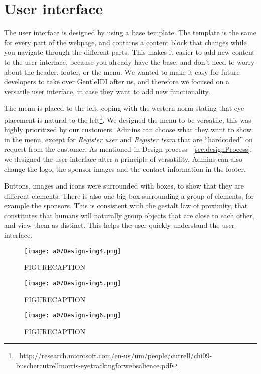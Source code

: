 \section{User interface}

The user interface is designed by using a base template. The template is
the same for every part of the webpage, and contains a content block
that changes while you navigate through the different parts. This makes
it easier to add new content to the user interface, because you already
have the base, and don't need to worry about the
header, footer, or the menu. We wanted to make it easy for future
developers to take over GentleIDI after us, and therefore we focused on
a versatile user interface, in case they want to add new functionality.

The menu is placed to the left, coping with the western norm stating
that eye placement is natural to the
left\footnote{\ http://research.microsoft.com/en-us/um/people/cutrell/chi09-buschercutrellmorris-eyetrackingforwebsalience.pdf}.
We designed the menu to be versatile, this was highly prioritized by our customers.
Admins can choose what they want to show in the menu, except for \textit{Register user} and
\textit{Register team} that are ``hardcoded'' on request from the
customer. As mentioned
in Design process ~\ref{sec:designProcess}, we designed the user interface after a principle
of versatility. Admins can also change the logo, the sponsor images and
the contact information in the footer.

Buttons, images and icons were surrounded with boxes, to show that they are different
elements. There is also one big box surrounding a group of elements,
for example the sponsors. This is consistent with the gestalt law of
proximity, that constitutes that humans will naturally group objects
that are close to each other, and view them as distinct.
This helps the user quickly understand the user interface.


 \begin{figure}[h!]
	\texttt{[image: a07Design-img4.png]} 
	\caption{FIGURECAPTION}
	\label{fig:buttons}
\end{figure}
\begin{figure}[h!]
	\texttt{[image: a07Design-img5.png]} 
	\caption{FIGURECAPTION}
\end{figure}
\begin{figure}[h!]
	\texttt{[image: a07Design-img6.png]} 
	\caption{FIGURECAPTION}
\end{figure}


